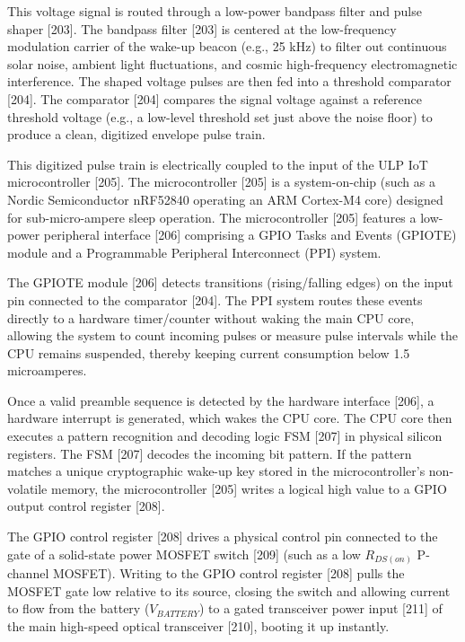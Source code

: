 \documentclass[12pt,a4paper]{article}
\begin{document}
This voltage signal is routed through a low-power bandpass filter and pulse shaper [203]. The bandpass filter [203] is centered at the low-frequency modulation carrier of the wake-up beacon (e.g., 25 kHz) to filter out continuous solar noise, ambient light fluctuations, and cosmic high-frequency electromagnetic interference. The shaped voltage pulses are then fed into a threshold comparator [204]. The comparator [204] compares the signal voltage against a reference threshold voltage (e.g., a low-level threshold set just above the noise floor) to produce a clean, digitized envelope pulse train.

This digitized pulse train is electrically coupled to the input of the ULP IoT microcontroller [205]. The microcontroller [205] is a system-on-chip (such as a Nordic Semiconductor nRF52840 operating an ARM Cortex-M4 core) designed for sub-micro-ampere sleep operation. The microcontroller [205] features a low-power peripheral interface [206] comprising a GPIO Tasks and Events (GPIOTE) module and a Programmable Peripheral Interconnect (PPI) system. 

The GPIOTE module [206] detects transitions (rising/falling edges) on the input pin connected to the comparator [204]. The PPI system routes these events directly to a hardware timer/counter without waking the main CPU core, allowing the system to count incoming pulses or measure pulse intervals while the CPU remains suspended, thereby keeping current consumption below 1.5 microamperes. 

Once a valid preamble sequence is detected by the hardware interface [206], a hardware interrupt is generated, which wakes the CPU core. The CPU core then executes a pattern recognition and decoding logic FSM [207] in physical silicon registers. The FSM [207] decodes the incoming bit pattern. If the pattern matches a unique cryptographic wake-up key stored in the microcontroller's non-volatile memory, the microcontroller [205] writes a logical high value to a GPIO output control register [208]. 

The GPIO control register [208] drives a physical control pin connected to the gate of a solid-state power MOSFET switch [209] (such as a low $R_{DS(on)}$ P-channel MOSFET). Writing to the GPIO control register [208] pulls the MOSFET gate low relative to its source, closing the switch and allowing current to flow from the battery ($V_{BATTERY}$) to a gated transceiver power input [211] of the main high-speed optical transceiver [210], booting it up instantly.
\end{document}
